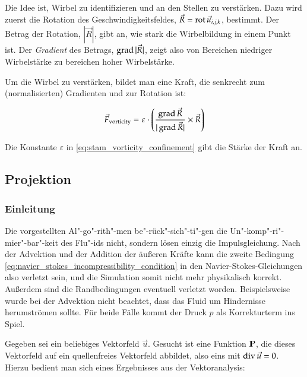 Die Idee ist, Wirbel zu identifizieren und an den 
Stellen zu verstärken. Dazu wird zuerst die Rotation des Geschwindigkeitsfeldes,
$\vec{R} = \operatorname*{rot} \vec{u}_{i,j,k}$, bestimmt. Der Betrag der Rotation,
$|\vec{R}|$, gibt an, wie stark die Wirbelbildung in einem Punkt ist. Der
\emph{Gradient} des Betrags, $\operatorname*{grad} |\vec{R}|$, zeigt also
von Bereichen niedriger Wirbelstärke zu bereichen hoher Wirbelstärke.

Um die Wirbel zu verstärken, bildet man eine Kraft, die senkrecht zum
(normalisierten) Gradienten und zur Rotation ist:

\begin{equation}
\label{eq:stam_vorticity_confinement}
\vec{F}_{\textnormal{vorticity}}
=
\varepsilon \cdot
\left(
	\frac
	{
		\operatorname*{grad} \vec{R}
	}
	{
		|\operatorname*{grad} \vec{R}|
	}
	\times
	\vec{R}
\right)
\end{equation}

Die Konstante $\varepsilon$ in \autoref{eq:stam_vorticity_confinement} gibt die
Stärke der Kraft an.

\subsection{Projektion}
\label{sec:stam_projection}

\subsubsection{Einleitung}

Die vorgestellten Al"-go"-rith"-men be"-rück"-sich"-ti"-gen die
Un"-komp"-ri"-mier"-bar"-keit des Flu"-ids nicht, sondern lösen einzig
die Impulsgleichung. Nach der Advektion und der Addition der äußeren
Kräfte kann die zweite Bedingung
\ref{eq:navier_stokes_incompressibility_condition} in den
Navier-Stokes-Gleichungen also verletzt sein, und die Simulation somit
nicht mehr physikalisch korrekt. Außerdem sind die Randbedingungen
eventuell verletzt worden. Beispielsweise wurde bei der Advektion
nicht beachtet, dass das Fluid um Hindernisse herumströmen sollte. Für
beide Fälle kommt der Druck $p$ als Korrekturterm ins Spiel.

Gegeben sei ein beliebiges Vektorfeld $\vec{u}$. Gesucht ist eine Funktion
$\mathbb{P}$, die dieses Vektorfeld auf ein quellenfreies Vektorfeld
abbildet, also eins mit $\operatorname*{div} \vec{u} = 0$. Hierzu bedient man sich eines
Ergebnisses aus der Vektoranalysis:


